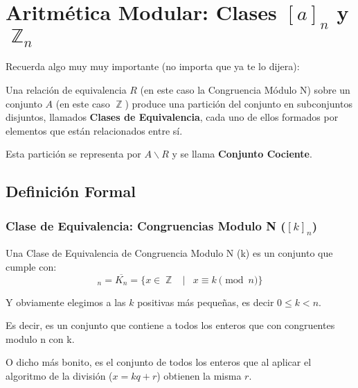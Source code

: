 \documentclass[12pt]{report}                                    %
\DeclareMathOperator \Space {\quad}                             %
\DeclareMathOperator \MiniSpace {\;}                            %
\newcommand \Such {\MiniSpace|\MiniSpace}                       %
\DeclareMathOperator \Integers  {\mathbb{Z}}                     %
\begin{document}
    \clearpage
    \section{Aritmética Modular: Clases $[a]_n$ y $\Integers_n$}

        Recuerda algo muy muy importante (no importa que ya te lo dijera):

        Una relación de equivalencia $R$ (en este caso la Congruencia Módulo N)
        sobre un conjunto $A$ (en este caso $\Integers$) produce una partición
        del conjunto en subconjuntos disjuntos, llamados \textbf{Clases de
        Equivalencia}, cada uno de ellos formados por elementos que están
        relacionados entre sí.

        Esta partición se representa por $A \backslash R$ y se llama
        \textbf{Conjunto Cociente}.


        \subsection*{Definición Formal}

            \subsubsection*{Clase de Equivalencia: Congruencias Modulo N ($[k]_n$)}

                Una Clase de Equivalencia de Congruencia Modulo N (k) es un conjunto
                que cumple con:
                \begin{equation}
                    [k]_n = \overline{K_n} = \{ x \in \Integers \Such x \equiv k \pmod{n} \}
                \end{equation}

                Y obviamente elegimos a las $k$ positivas más pequeñas, es decir 
                $0 \leq k < n$.

                Es decir, es un conjunto que contiene a todos los enteros que con
                congruentes modulo n con k.

                O dicho más bonito, es el conjunto de todos los enteros que al aplicar
                el algoritmo de la división ($x = kq+r$) obtienen la misma $r$.\\
\end{document}
